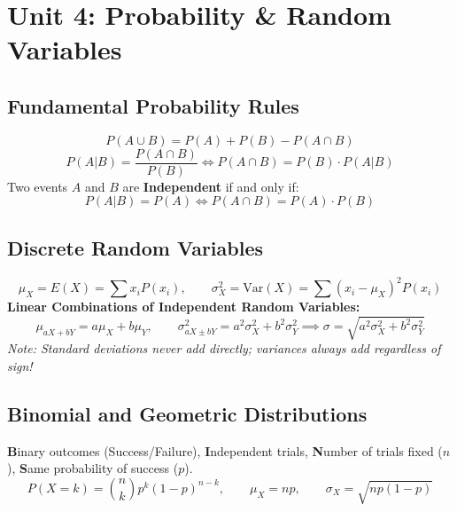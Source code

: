 \documentclass[11pt,oneside,openany]{book}
\begin{document}
\chapter{Unit 4: Probability \& Random Variables}

\section{Fundamental Probability Rules}
\begin{equation}
  P(A \cup B) = P(A) + P(B) - P(A \cap B)
\end{equation}
\begin{equation}
  P(A|B) = \frac{P(A \cap B)}{P(B)} \iff P(A \cap B) = P(B) \cdot P(A|B)
\end{equation}
Two events $A$ and $B$ are \textbf{Independent} if and only if:
\begin{equation}
  P(A|B) = P(A) \iff P(A \cap B) = P(A) \cdot P(B)
\end{equation}

\section{Discrete Random Variables}
\begin{equation}
  \mu_X = E(X) = \sum x_i P(x_i), \qquad \sigma_X^2 = \text{Var}(X) = \sum (x_i - \mu_X)^2 P(x_i)
\end{equation}
\textbf{Linear Combinations of Independent Random Variables:}
\begin{equation}
  \mu_{aX + bY} = a\mu_X + b\mu_Y, \qquad \sigma_{aX \pm bY}^2 = a^2\sigma_X^2 + b^2\sigma_Y^2 \implies \sigma = \sqrt{a^2\sigma_X^2 + b^2\sigma_Y^2}
\end{equation}
\textit{Note: Standard deviations never add directly; variances always add regardless of sign!}

\section{Binomial and Geometric Distributions}
\begin{lessonbox}
\textbf{B}inary outcomes (Success/Failure), \textbf{I}ndependent trials, \textbf{N}umber of trials fixed ($n$), \textbf{S}ame probability of success ($p$).
\begin{equation}
  P(X = k) = \binom{n}{k} p^k (1-p)^{n-k}, \qquad \mu_X = np, \qquad \sigma_X = \sqrt{np(1-p)}
\end{equation}
\end{lessonbox}
\end{document}
